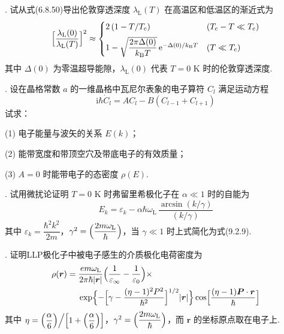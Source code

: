 {.} 试从式(6.8.50)导出伦敦穿透深度 $\lambda_{\mathrm{L}}(T)$ 在高温区和低温区的渐近式为
\begin{equation*}
  \Bigl[\frac{\lambda_{\mathrm{L}}(0)}{\lambda_{\mathrm{L}}(T)}\Bigr]^{2}\approx
  \begin{cases}
    2\left(1-T/T_{\mathrm{c}}\right) & \left(T_{\mathrm{c}}-T\ll T_{\mathrm{c}}\right)\\[0.5em]
    1-\sqrt{\dfrac{2\pi\Delta(0)}{k_{\mathrm{B}}T}}\,\mathrm{e}^{-\Delta(0)/k_{\mathrm{B}}T} & \left(T\ll T_{\mathrm{c}}\right)
  \end{cases}
\end{equation*}
其中 $\Delta(0)$ 为零温超导能隙，$\lambda_{\mathrm{L}}(0)$ 代表 $T=0$ K 时的伦敦穿透深度.

{.} 设在晶格常数 $a$ 的一维晶格中瓦尼尔表象的电子算符 $C_{l}$ 满足运动方程
\begin{equation*}
  \mathrm{i}\hbar\dot{C}_{l}=AC_{l}-B\left(C_{l-1}+C_{l+1}\right)
\end{equation*}
试求：

(1) 电子能量与波矢的关系 $E(k)$；

(2) 能带宽度和带顶空穴及带底电子的有效质量；

(3) $A=0$ 时能带电子的态密度 $\rho(E)$.

{.} 试用微扰论证明 $T=0$ K 时弗留里希极化子在 $\alpha\ll1$ 时的自能为
\begin{equation*}
  E_{k}=\varepsilon_{k}-\alpha\hbar\omega_{\mathrm{L}}\,
  \frac{\arcsin(k/\gamma)}{(k/\gamma)}
\end{equation*}
其中 $\varepsilon_{k}=\dfrac{\hbar^{2}k^{2}}{2m}$，$\gamma^{2}=\Bigl(\dfrac{2m\omega_{\mathrm{L}}}{\hbar}\Bigr)$，当 $\gamma\ll1$ 时上式简化为式(9.2.9).

{.} 证明LLP极化子中被电子感生的介质极化电荷密度为
\begin{equation*}
\begin{aligned}
  \rho(\boldsymbol{r})={}&\frac{em\omega_{\mathrm{L}}}{2\pi\hbar|\boldsymbol{r}|}
  \Bigl(\frac{1}{\varepsilon_{\infty}}-\frac{1}{\varepsilon_{0}}\Bigr)\times\\
  &\exp\Bigl\{-\Bigl[\gamma-\frac{(\eta-1)^{2}P^{2}}{\hbar^{2}}\Bigr]^{1/2}
  |\boldsymbol{r}|\Bigr\}
  \cos\Bigl[\frac{(\eta-1)\boldsymbol{P}\cdot\boldsymbol{r}}{\hbar}\Bigr]
\end{aligned}
\end{equation*}
其中 $\eta=\Bigl(\dfrac{\alpha}{6}\Bigr)\Big/\Bigl[1+\Bigl(\dfrac{\alpha}{6}\Bigr)\Bigr]$，$\gamma^{2}=\Bigl(\dfrac{2m\omega_{\mathrm{L}}}{\hbar}\Bigr)$，而 $\boldsymbol{r}$ 的坐标原点取在电子上.

